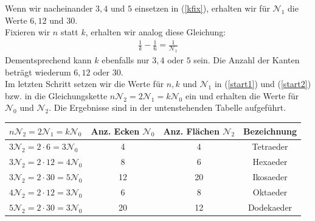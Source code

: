 Wenn wir nacheinander $3,4$ und $5$ einsetzen in (\ref{kfix}), erhalten wir für $\mathcal{N}_1$ die Werte $6, 12$ und $30$.\\
Fixieren wir $n$ statt $k$, erhalten wir analog diese Gleichung: 
\begin{align}
\frac{1}{k}- \frac{1}{6}= \frac{1}{\mathcal{N}_1} \label{nfix}
\end{align}
 Dementsprechend kann $k$ ebenfalls nur $3,4$ oder $5$ sein. Die Anzahl der Kanten beträgt wiederum $6, 12$ oder $30$.\\
Im letzten Schritt setzen wir die Werte für $n,k$ und $\mathcal{N}_1$ in (\ref{start1}) und (\ref{start2}) bzw. in die Gleichungskette $n\mathcal{N}_2=2\mathcal{N}_1=k\mathcal{N}_0$ ein und erhalten die Werte für $\mathcal{N}_0$ und $\mathcal{N}_2$. Die Ergebnisse sind in der untenstehenden Tabelle aufgeführt.
\begin{center}
\begin{tabular}{p{3.5cm}|c|c|c}
$n\mathcal{N}_2=2\mathcal{N}_1=k\mathcal{N}_0$ & Anz. Ecken $\mathcal{N}_0$& Anz. Flächen $\mathcal{N}_2$& Bezeichnung\\ \hline
$3\mathcal{N}_2=2 \cdot 6=3\mathcal{N}_0$& 4 & 4 & Tetraeder\\ \hline
$3\mathcal{N}_2=2 \cdot 12=4\mathcal{N}_0$& 8 & 6 & Hexaeder \\ \hline
$3\mathcal{N}_2=2 \cdot 30=5\mathcal{N}_0$& 12 & 20 & Ikosaeder\\ \hline
$4\mathcal{N}_2=2 \cdot 12=3\mathcal{N}_0$& 6 & 8 & Oktaeder \\ \hline
$5\mathcal{N}_2=2 \cdot 30=3\mathcal{N}_0$& 20 & 12 & Dodekaeder

\end{tabular}
\end{center}
